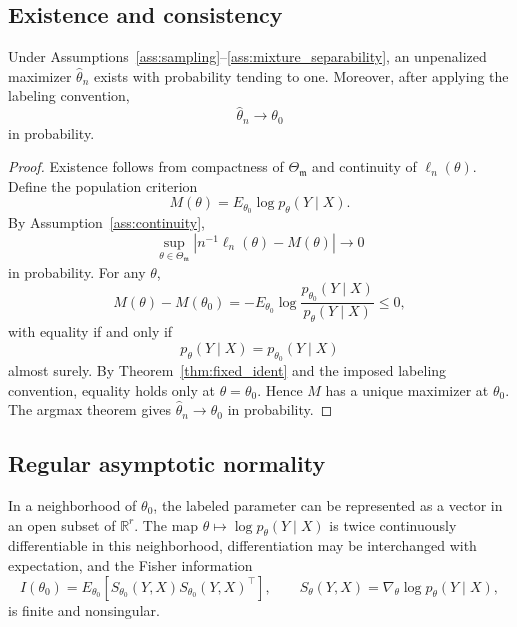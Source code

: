 \subsection{Existence and consistency}

\begin{theorem}
\label{thm:consistency}
Under Assumptions~\ref{ass:sampling}--\ref{ass:mixture_separability}, an
unpenalized maximizer \(\hat\theta_n\) exists with probability tending to one.
Moreover, after applying the labeling convention,
\[
    \hat\theta_n\to\theta_0
\]
in probability.
\end{theorem}

\begin{proof}
Existence follows from compactness of \(\Theta_{\mathfrak m}\) and continuity of
\(\ell_n(\theta)\).  Define the population criterion
\[
    M(\theta)=E_{\theta_0}\log p_\theta(Y\mid X).
\]
By Assumption~\ref{ass:continuity},
\[
    \sup_{\theta\in\Theta_{\mathfrak m}}
    |n^{-1}\ell_n(\theta)-M(\theta)|
    \to 0
\]
in probability.  For any \(\theta\),
\[
    M(\theta)-M(\theta_0)
    =
    -E_{\theta_0}
    \log\frac{p_{\theta_0}(Y\mid X)}{p_\theta(Y\mid X)}
    \le 0,
\]
with equality if and only if
\[
    p_\theta(Y\mid X)=p_{\theta_0}(Y\mid X)
\]
almost surely.  By Theorem~\ref{thm:fixed_ident} and the imposed labeling
convention, equality holds only at \(\theta=\theta_0\).  Hence \(M\) has a
unique maximizer at \(\theta_0\).  The argmax theorem gives
\(\hat\theta_n\to\theta_0\) in probability.
\end{proof}

\subsection{Regular asymptotic normality}

\begin{assumption}
\label{ass:local_regular}
In a neighborhood of \(\theta_0\), the labeled parameter can be represented as a
vector in an open subset of \(\mathbb R^r\).  The map
\(\theta\mapsto \log p_\theta(Y\mid X)\) is twice continuously differentiable
in this neighborhood, differentiation may be interchanged with expectation, and
the Fisher information
\[
    I(\theta_0)
    =
    E_{\theta_0}
    \left[
        S_{\theta_0}(Y,X)S_{\theta_0}(Y,X)^\top
    \right],
    \qquad
    S_{\theta}(Y,X)=\nabla_\theta\log p_\theta(Y\mid X),
\]
is finite and nonsingular.
\end{assumption}

